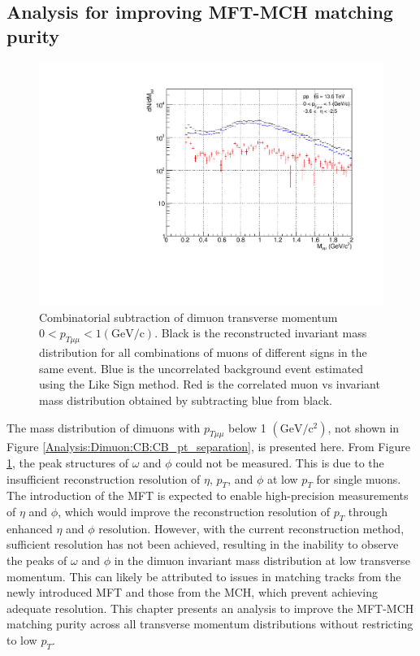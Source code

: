     \subsection{Analysis for improving MFT-MCH matching purity}
    \label{matching improvements}
        \begin{figure}
            \centering
            \includegraphics[keepaspectratio, scale=0.4]{fig/3_6_CB_pt0to1.pdf}
            \caption{Combinatorial subtraction of dimuon transverse momentum $0 < p_{T\mu\mu} < 1 (\mathrm{GeV/c})$. Black is the reconstructed invariant mass distribution for all combinations of muons of different signs in the same event. Blue is the uncorrelated background event estimated using the Like Sign method. Red is the correlated muon vs invariant mass distribution obtained by subtracting blue from black.}
            \label{Analysis:Dimuon:pt0to1}
        \end{figure}
        The mass distribution of dimuons with \( p_{T\mu\mu} \) below 1 $(\mathrm{GeV/c^2})$, not shown in Figure \ref{Analysis:Dimuon:CB:CB_pt_separation}, is presented here.
        From Figure \ref{Analysis:Dimuon:pt0to1}, the peak structures of \(\omega\) and \(\phi\) could not be measured. This is due to the insufficient reconstruction resolution of \(\eta\), \(p_T\), and \(\phi\) at low \(p_T\) for single muons. The introduction of the MFT is expected to enable high-precision measurements of \(\eta\) and \(\phi\), which would improve the reconstruction resolution of \(p_T\) through enhanced \(\eta\) and \(\phi\) resolution. However, with the current reconstruction method, sufficient resolution has not been achieved, resulting in the inability to observe the peaks of \(\omega\) and \(\phi\) in the dimuon invariant mass distribution at low transverse momentum. This can likely be attributed to issues in matching tracks from the newly introduced MFT and those from the MCH, which prevent achieving adequate resolution. This chapter presents an analysis to improve the MFT-MCH matching purity across all transverse momentum distributions without restricting to low \(p_T\).

